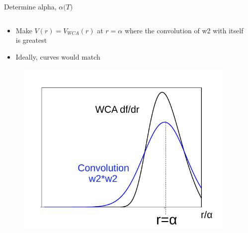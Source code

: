 \documentclass{beamer}
\begin{document}
\begin{frame}{Determine alpha, $\alpha{(}T)$}
	\begin{columns}[t]
	    \vspace{-01em}
		\begin{block}{}
			\begin{itemize}
			    \item Make $V(r)=V_{WCA}(r)$ at $r=\alpha$ where 
			    the convolution of w2 with itself is greatest
			    \item Ideally, curves would match
			\end{itemize}
				\vspace{-0.5em}
			   \begin{figure}
                   \centering
                   \includegraphics[width=.9\columnwidth]{figs/df_dr_with_xi_fromB2_pic.pdf}
                \end{figure}
		\end{block}	  
		\column{.55\textwidth}
        \vspace{-0.5em}
        \begin{block}{}
        \begin{itemize}

\end{itemize}
\end{block}
\end{columns}
\end{frame}
\end{document}
